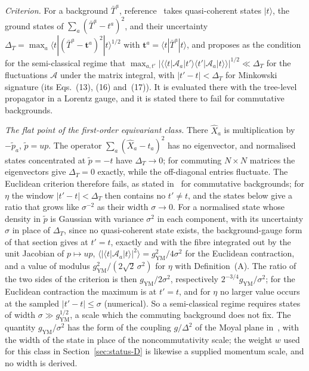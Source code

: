 \emph{Criterion.} For a background \(\bar T^a\), reference~\cite{Steinacker2026Weak} takes quasi-coherent states \(|t\rangle\), the ground states of \(\sum_a(\bar T^a-t^a)^2\), and their uncertainty \(\Delta_T=\max_a\langle t|(\bar T^a-\mathbf t^a)^2|t\rangle^{1/2}\) with \(\mathbf t^a=\langle t|\bar T^a|t\rangle\), and proposes as the condition for the semi-classical regime that \(\max_{a,t'}\bigl|\bigl\langle\langle t|\mathcal A_a|t'\rangle\langle t'|\mathcal A_a|t\rangle\bigr\rangle\bigr|^{1/2}\ll\Delta_T\) for the fluctuations \(\mathcal A\) under the matrix integral, with \(|t'-t|<\Delta_T\) for Minkowski signature (its Eqs.~(13), (16) and~(17)). It is evaluated there with the tree-level propagator in a Lorentz gauge, and it is stated there to fail for commutative backgrounds.

\emph{The flat point of the first-order equivariant class.} There \(\hat X_a\) is multiplication by \(-\tilde p_a\), \(\tilde p=up\). The operator \(\sum_a(\hat X_a-t_a)^2\) has no eigenvector, and normalised states concentrated at \(\tilde p=-t\) have \(\Delta_T\to0\); for commuting \(N\times N\) matrices the eigenvectors give \(\Delta_T=0\) exactly, while the off-diagonal entries fluctuate. The Euclidean criterion therefore fails, as stated in~\cite{Steinacker2026Weak} for commutative backgrounds; for \(\eta\) the window \(|t'-t|<\Delta_T\) then contains no \(t'\neq t\), and the states below give a ratio that grows like \(\sigma^{-2}\) as their width \(\sigma\to0\). For a normalised state whose density in \(\tilde p\) is Gaussian with variance \(\sigma^2\) in each component, with its uncertainty \(\sigma\) in place of \(\Delta_T\), since no quasi-coherent state exists, the background-gauge form of that section gives at \(t'=t\), exactly and with the fibre integrated out by the unit Jacobian of \(p\mapsto up\), \(\langle|\langle t|\mathcal A_a|t\rangle|^2\rangle=g_{\mathrm{YM}}^2/4\sigma^2\) for the Euclidean contraction, and a value of modulus \(g_{\mathrm{YM}}^2/(2\sqrt2\,\sigma^2)\) for \(\eta\) with Definition~(A). The ratio of the two sides of the criterion is then \(g_{\mathrm{YM}}/2\sigma^2\), respectively \(2^{-3/4}g_{\mathrm{YM}}/\sigma^2\); for the Euclidean contraction the maximum is at \(t'=t\), and for \(\eta\) no larger value occurs at the sampled \(|t'-t|\le\sigma\) (numerical). So a semi-classical regime requires states of width \(\sigma\gg g_{\mathrm{YM}}^{1/2}\), a scale which the commuting background does not fix. The quantity \(g_{\mathrm{YM}}/\sigma^2\) has the form of the coupling \(g/\Delta^2\) of the Moyal plane in~\cite{Steinacker2026Weak}, with the width of the state in place of the noncommutativity scale; the weight \(w\) used for this class in Section~\ref{sec:status-D} is likewise a supplied momentum scale, and no width is derived.

